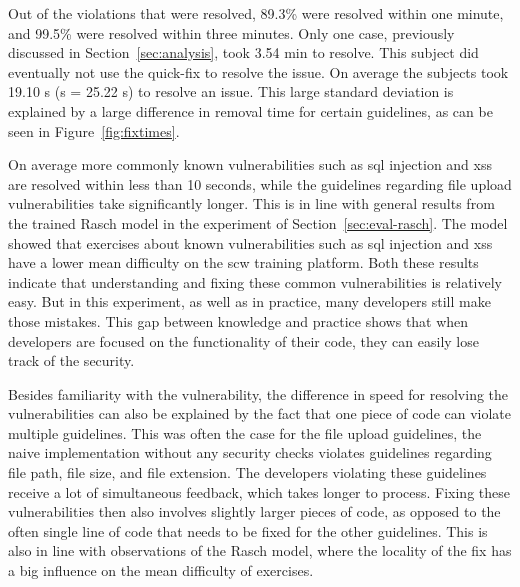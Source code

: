 Out of the violations that were resolved, 89.3\% were resolved within one minute, and 99.5\% were resolved within three minutes.
Only one case, previously discussed in Section~\ref{sec:analysis}, took 3.54 min to resolve.
This subject did eventually not use the quick-fix to resolve the issue.
On average the subjects took 19.10 s (s = 25.22 s) to resolve an issue.
This large standard deviation is explained by a large difference in removal time for certain guidelines, as can be seen in Figure~\ref{fig:fixtimes}.

On average more commonly known vulnerabilities such as \gls{sql} injection and \gls{xss} are resolved within less than 10 seconds, while the guidelines regarding file upload vulnerabilities take significantly longer.
This is in line with general results from the trained Rasch model in the experiment of Section~\ref{sec:eval-rasch}.
The model showed that exercises about known vulnerabilities such as \gls{sql} injection and \gls{xss} have a lower mean difficulty on the \gls{scw} training platform.
Both these results indicate that understanding and fixing these common vulnerabilities is relatively easy.
But in this experiment, as well as in practice, many developers still make those mistakes.
This gap between knowledge and practice shows that when developers are focused on the functionality of their code, they can easily lose track of the security.

Besides familiarity with the vulnerability, the difference in speed for resolving the vulnerabilities can also be explained by the fact that one piece of code can violate multiple guidelines.
This was often the case for the file upload guidelines, the naive implementation without any security checks violates guidelines regarding file path, file size, and file extension.
The developers violating these guidelines receive a lot of simultaneous feedback, which takes longer to process.
Fixing these vulnerabilities then also involves slightly larger pieces of code, as opposed to the often single line of code that needs to be fixed for the other guidelines.
This is also in line with observations of the Rasch model, where the locality of the fix has a big influence on the mean difficulty of exercises.

